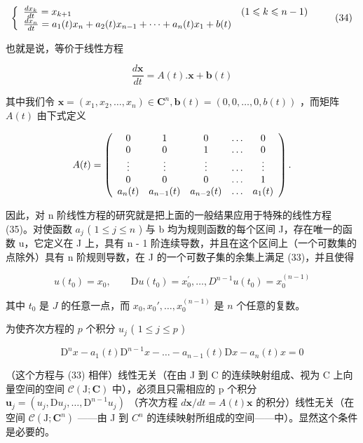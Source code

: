 \[
\left\{ \begin{array}{l l} \frac {d x _ {k}}{d t} = x _ {k + 1} & (1 \leqslant k \leqslant n - 1) \\ \frac {d x _ {n}}{d t} = a _ {1} (t) x _ {n} + a _ {2} (t) x _ {n - 1} + \dots + a _ {n} (t) x _ {1} + b (t) \end{array} \right.\tag{34}
\]

也就是说，等价于线性方程

\[
\frac {d \mathbf {x}}{d t} = A (t). \mathbf {x} + \mathbf {b} (t)\tag{35}
\]

其中我们令 \(\mathbf{x}=(x_{1},x_{2},\ldots,x_{n})\in\mathbf{C}^{n},\mathbf{b}(t)=(0,0,\ldots,0,b(t))\) ，而矩阵 \(A(t)\) 由下式定义

\[
A (t) = \left( \begin{array}{c c c c c} 0 & 1 & 0 & \ldots & 0 \\ 0 & 0 & 1 & \ldots & 0 \\ \vdots & \vdots & \vdots & \ldots & \vdots \\ 0 & 0 & 0 & \ldots & 1 \\ a _ {n} (t) & a _ {n - 1} (t) & a _ {n - 2} (t) & \ldots & a _ {1} (t) \end{array} \right).
\]

因此，对 n 阶线性方程的研究就是把上面的一般结果应用于特殊的线性方程 (35)。对使函数 \(a_{j}\) ( \(1 \leqslant j \leqslant n\) ) 与 b 均为规则函数的每个区间 J，存在唯一的函数 u，它定义在 J 上，具有 n - 1 阶连续导数，并且在这个区间上（一个可数集的点除外）具有 n 阶规则导数，在 J 的一个可数子集的余集上满足 (33)，并且使得

\[
u (t _ {0}) = x _ {0}, \qquad \mathrm{D} u (t _ {0}) = x _ {0} ^ {\prime}, \dots , D ^ {n - 1} u (t _ {0}) = x _ {0} ^ {(n - 1)}\tag{36}
\]

其中 \(t_0\) 是 \(J\) 的任意一点，而 \(x_0, x_0', \ldots, x_0^{(n-1)}\) 是 \(n\) 个任意的复数。

为使齐次方程的 \(p\) 个积分 \(u_{j}\) ( \(1 \leqslant j \leqslant p\) )

\[
\mathrm{D} ^ {n} x - a _ {1} (t) \mathrm{D} ^ {n - 1} x - \dots - a _ {n - 1} (t) \mathrm{D} x - a _ {n} (t) x = 0\tag{37}
\]

（这个方程与 (33) 相伴）线性无关（在由 J 到 C 的连续映射组成、视为 C 上向量空间的空间 \(\mathcal{C}(\mathrm{J};\mathbf{C})\) 中），必须且只需相应的 p 个积分 \(\mathbf{u}_{j}=(u_{j},\mathrm{D}u_{j},\ldots,\mathrm{D}^{n-1}u_{j})\) （齐次方程 \(d\mathbf{x}/dt=A(t)\mathbf{x}\) 的积分）线性无关（在空间 \(\mathcal{C}(\mathrm{J};\mathbf{C}^{n})\) ——由 J 到 \(C^{n}\) 的连续映射所组成的空间——中）。显然这个条件是必要的。

